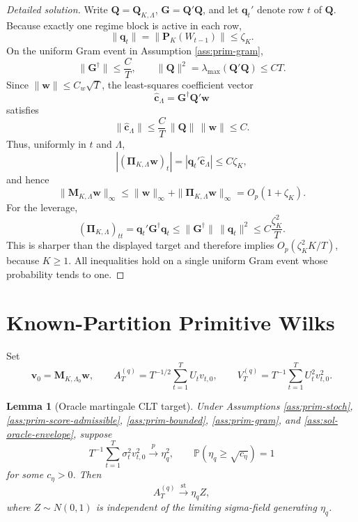 \documentclass[12pt]{article}
\numberwithin{equation}{section}
\newtheorem{lemma}{Lemma}
\theoremstyle{definition}
\newcommand{\Pp}{\mathbb P}
\begin{document}
\begin{proof}[Detailed solution]
Write \(\bm Q=\bm Q_{K,\Lambda}\), \(\bm G=\bm Q'\bm Q\), and let
\(\bm q_t'\) denote row \(t\) of \(\bm Q\).  Because exactly one regime block
is active in each row,
\[
    \|\bm q_t\|=\|\bm P_K(W_{t-1})\|\leq\zeta_K.
\]
On the uniform Gram event in Assumption \ref{ass:prim-gram},
\[
    \|\bm G^\dagger\|\leq \frac{C}{T},
    \qquad
    \|\bm Q\|^2=\lambda_{\max}(\bm Q'\bm Q)\leq CT.
\]
Since \(\|\bm w\|\leq C_w\sqrt T\), the least-squares coefficient vector
\[
    \widehat{\bm c}_\Lambda=\bm G^\dagger\bm Q'\bm w
\]
satisfies
\[
    \|\widehat{\bm c}_\Lambda\|
    \leq \frac{C}{T}\,\|\bm Q\|\,\|\bm w\|
    \leq C.
\]
Thus, uniformly in \(t\) and \(\Lambda\),
\[
    |(\bm\Pi_{K,\Lambda}\bm w)_t|
    =|\bm q_t'\widehat{\bm c}_\Lambda|
    \leq C\zeta_K,
\]
and hence
\[
    \|\bm M_{K,\Lambda}\bm w\|_\infty
    \leq \|\bm w\|_\infty+
          \|\bm\Pi_{K,\Lambda}\bm w\|_\infty
    =O_p(1+\zeta_K).
\]
For the leverage,
\[
    (\bm\Pi_{K,\Lambda})_{tt}
    =\bm q_t'\bm G^\dagger\bm q_t
    \leq \|\bm G^\dagger\|\,\|\bm q_t\|^2
    \leq C\frac{\zeta_K^2}{T}.
\]
This is sharper than the displayed target and therefore implies
\(O_p(\zeta_K^2K/T)\), because \(K\geq1\).  All inequalities hold on a single
uniform Gram event whose probability tends to one.
\end{proof}


\section{Known-Partition Primitive Wilks}

Set
\[
    \bm v_0=\bm M_{K,\Lambda_0}\bm w,
    \qquad
    A_T^{(q)}=T^{-1/2}\sum_{t=1}^TU_tv_{t,0},
    \qquad
    V_T^{(q)}=T^{-1}\sum_{t=1}^TU_t^2v_{t,0}^2.
\]

\begin{lemma}[Oracle martingale CLT target]
\label{lem:wb-oracle-clt}
Under Assumptions \ref{ass:prim-stoch}, \ref{ass:prim-score-admissible},
\ref{ass:prim-bounded}, \ref{ass:prim-gram}, and
\ref{ass:sol-oracle-envelope}, suppose
\[
    T^{-1}\sum_{t=1}^T \sigma_t^2v_{t,0}^2\xrightarrow{p}\eta_q^2,
    \qquad
    \Pp(\eta_q\geq \sqrt{c_\eta})=1
\]
for some \(c_\eta>0\). Then
\[
    A_T^{(q)}\xrightarrow{\mathrm{st}}\eta_qZ,
\]
where \(Z\sim N(0,1)\) is independent of the limiting sigma-field generating \(\eta_q\).
\end{lemma}
\end{document}
